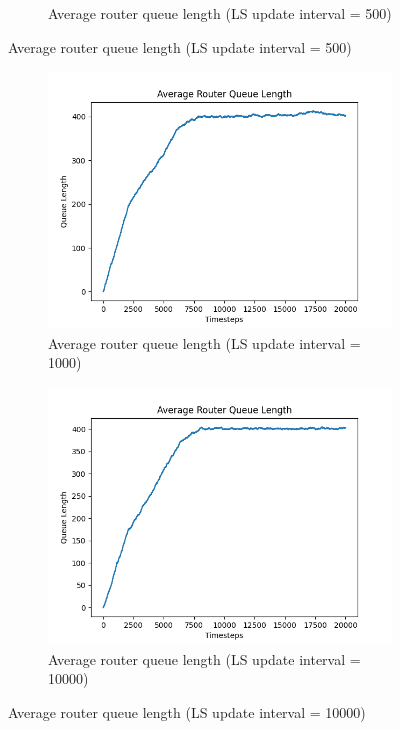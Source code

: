 \begin{appendices}
\begin{figure}[H]
\begin{subfigure}[b]{0.475\textwidth}
            \caption[]{Average router queue length (LS update interval = 500)}
        \end{subfigure}
    \end{figure}
    \begin{figure}[H]\ContinuedFloat
        \centering
        \begin{subfigure}[t]{0.475\textwidth}
            \centering
            \includegraphics[width=\textwidth]{figs/appendix/average_ls=1000.png}
            \caption[]{Average router queue length (LS update interval = 1000)}
            \label{fig:avgq-1000}
        \end{subfigure}
        \hfill
        \begin{subfigure}[t]{0.475\textwidth}
            \centering
            \includegraphics[width=\textwidth]{figs/appendix/average_ls=10000.png}
            \caption[]{Average router queue length (LS update interval = 10000)}
            \label{fig:avgq-10000}
        \end{subfigure}
    \end{figure}
    

\end{appendices}
